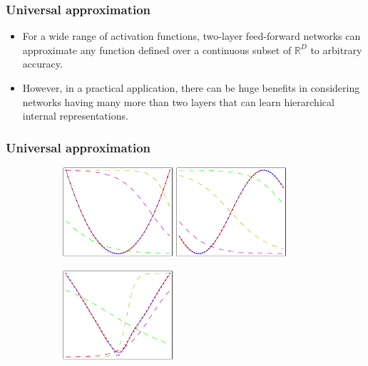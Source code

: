 \documentclass{beamer}
\begin{document}
\begin{frame}
    \frametitle{Universal approximation}
    \begin{itemize}
        \item For a wide range of activation functions, two-layer feed-forward networks can approximate any function defined over a continuous subset of $\mathbb{R}^{D}$ to arbitrary accuracy.
        \item However, in a practical application, there can be huge benefits in considering networks having many more than two layers that can learn hierarchical internal representations.
    \end{itemize}
\end{frame}

\begin{frame}
    \frametitle{Universal approximation}
    \begin{figure}
        \caption{Two-layer neural networks are universal approximators}
        \begin{subfigure}{0.7\textwidth}
            \includegraphics[width=0.45\textwidth]{Figure_10_a.pdf}
            \includegraphics[width=0.45\textwidth]{Figure_10_b.pdf}
        \end{subfigure}
        \begin{subfigure}{0.7\textwidth}
            \includegraphics[width=0.45\textwidth]{Figure_10_c.pdf}

\end{subfigure}
\end{figure}
\end{frame}
\end{document}
